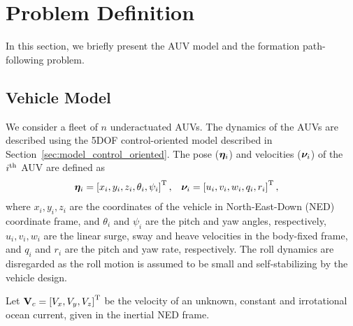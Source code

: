 \section{Problem Definition}
\label{sec:nsb_5dof_model}
In this section, we briefly present the AUV model and the formation path-following problem.

\subsection{Vehicle Model}
We consider a fleet of $n$ underactuated AUVs.
The dynamics of the AUVs are described using the 5DOF control-oriented model described in Section~\ref{sec:model_control_oriented}.
The pose ($\bm{\eta}_i$) and velocities ($\bm{\nu}_i$) of the $i^{\rm th}$ AUV are defined as
\begin{align}
    \bm{\eta}_i &= \left[x_i, y_i, z_i, \theta_i, \psi_i\right]^{\mathrm{T}}, &
    \bm{\nu}_i &= \left[u_i, v_i, w_i, q_i, r_i\right]^{\mathrm{T}},
\end{align}
where $x_i,y_i,z_i$ are the coordinates of the vehicle in North-East-Down (NED) coordinate frame, and $\theta_i$ and $\psi_i$ are the pitch and yaw angles, respectively, $u_i,v_i,w_i$ are the linear surge, sway and heave velocities in the body-fixed frame, and $q_i$ and $r_i$ are the pitch and yaw rate, respectively.
The roll dynamics are disregarded as the roll motion is assumed to be small and self-stabilizing by the vehicle design.

Let $\mathbf{V}_c = \left[V_x, V_y, V_z\right]^{\mathrm{T}}$ be the velocity of an unknown, constant and irrotational ocean current, given in the inertial NED frame.

